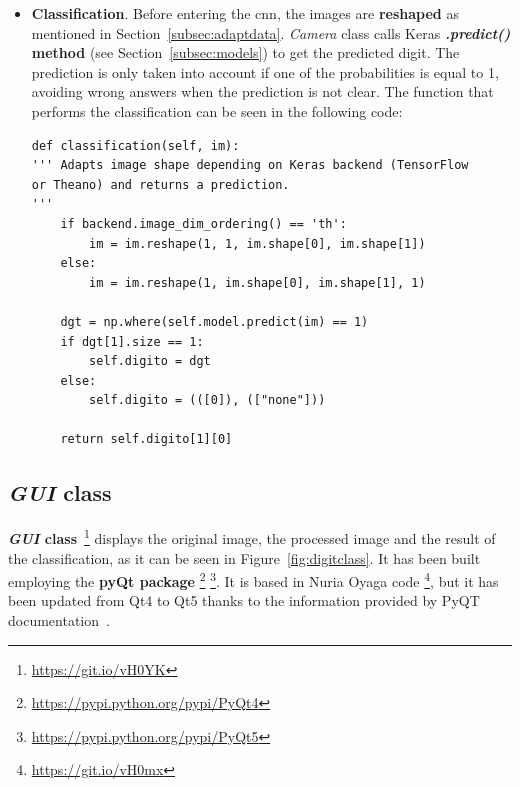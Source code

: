 \begin{itemize}
\begin{lstlisting}[frame=single]
	im_res = cv2.resize(im_blur, (28, 28))
	
	# Edge extraction.
	im_sobel_x = cv2.Sobel(im_res, cv2.CV_32F, 1, 0, ksize=5)
	im_sobel_y = cv2.Sobel(im_res, cv2.CV_32F, 0, 1, ksize=5)
	im_edges = cv2.add(abs(im_sobel_x), abs(im_sobel_y))
	im_edges = cv2.normalize(im_edges, None, 0, 255, cv2.NORM_MINMAX)
	im_edges = np.uint8(im_edges)
	
	return im_edges
\end{lstlisting}
	
	\item \textbf{Classification}. Before entering the \gls{cnn}, the images are \textbf{reshaped} as mentioned in Section~\ref{subsec:adaptdata}. \textit{Camera} class calls Keras \textbf{\textit{.predict()} method} (see Section~\ref{subsec:models}) to get the predicted digit. The prediction is only taken into account if one of the probabilities is equal to 1, avoiding wrong answers when the prediction is not clear. The function that performs the classification can be seen in the following code:
\begin{lstlisting}
def classification(self, im):
''' Adapts image shape depending on Keras backend (TensorFlow
or Theano) and returns a prediction.
'''
	if backend.image_dim_ordering() == 'th':
		im = im.reshape(1, 1, im.shape[0], im.shape[1])            
	else:      
		im = im.reshape(1, im.shape[0], im.shape[1], 1)            
	
	dgt = np.where(self.model.predict(im) == 1)
	if dgt[1].size == 1:
		self.digito = dgt
	else:
		self.digito = (([0]), (["none"]))
	
	return self.digito[1][0]
\end{lstlisting}
\end{itemize}

\subsection{\textit{GUI} class}
\textbf{\textit{GUI} class}~\footnote{\url{https://git.io/vH0YK}} displays the original image, the processed image and the result of the classification, as it can be seen in Figure~\ref{fig:digitclass}. It has been built employing the \textbf{pyQt package} \footnote{\url{https://pypi.python.org/pypi/PyQt4}} \footnote{\url{https://pypi.python.org/pypi/PyQt5}}. It is based in Nuria Oyaga code \footnote{\url{https://git.io/vH0mx}}, but it has been updated from Qt4  to Qt5  thanks to the information provided by PyQT documentation~\cite{pyqt5}.

